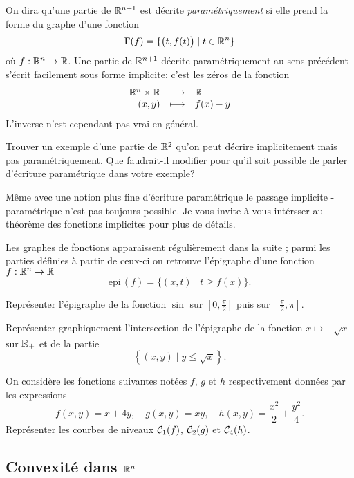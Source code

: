 \documentclass[11pt, a4paper]{article}
\begin{document}
On dira qu'une partie de $\mathbb{R}^{n+1}$ est décrite
\emph{paramétriquement} si elle prend la forme du graphe d'une
fonction
\[
  \Gamma(f) = \{ \big(t, f(t)\big) \mid t \in \mathbb{R}^n \}
\]
où $f : \mathbb{R}^n \to \mathbb{R}$. Une partie de $\mathbb{R}^{n+1}$ décrite
paramétriquement au sens précédent s'écrit facilement sous forme
implicite: c'est les zéros de la fonction
\[
  \begin{array}{rcl}
    \mathbb{R}^n \times \mathbb{R} & \longrightarrow & \mathbb{R} \\
    (x, y) & \longmapsto & f(x) - y
  \end{array}
\]
L'inverse n'est cependant pas vrai en général.
\begin{question}
  Trouver un exemple d'une partie de $\mathbb{R}^2$ qu'on peut décrire
  implicitement mais pas paramétriquement. Que faudrait-il modifier
  pour qu'il soit possible de parler d'écriture paramétrique dans
  votre exemple?
\end{question}
\begin{rem}
  Même avec une notion plus fine d'écriture paramétrique le passage
  implicite - paramétrique n'est pas toujours possible. Je vous invite
  à vous intérsser au théorème des fonctions implicites pour plus de
  détails.
\end{rem}
Les graphes de fonctions apparaissent régulièrement dans la suite ;
parmi les parties définies à partir de ceux-ci on retrouve l'épigraphe
d'une fonction $f : \mathbb{R}^n \to \mathbb{R}$
\[
  \mathrm{epi\,}(f) = \{ (x, t) \mid t \geq f(x) \}.
\]
\begin{question}
  Représenter l'épigraphe de la fonction $\sin$ sur
  $[0, \frac{\pi}{2}]$ puis sur $[\frac{\pi}{2}, \pi]$.
\end{question}
\begin{question}
  \label{q:partieB}
  Représenter graphiquement l'intersection de l'épigraphe de la
  fonction $x \mapsto -\sqrt{x}$ sur $\mathbb{R}_+$ et de la partie
  \[
    \left\{(x, y) \mid y \leq \sqrt{x}\right\}.
  \]
\end{question}
\begin{question}
  \label{q:courbeniveau}
  On considère les fonctions suivantes notées $f$, $g$ et $h$
  respectivement données par les expressions
  \[
    f(x, y) = x + 4y, \quad g(x, y) = xy, \quad h(x, y) = \frac{x^2}{2} + \frac{y^2}{4}.
  \]
  Représenter les courbes de niveaux $\mathcal{C}_1(f)$, $\mathcal{C}_2(g)$ et
  $\mathcal{C}_{4}(h)$.
\end{question}

\subsection{Convexité dans $\mathbb{R}^n$}
\end{document}
